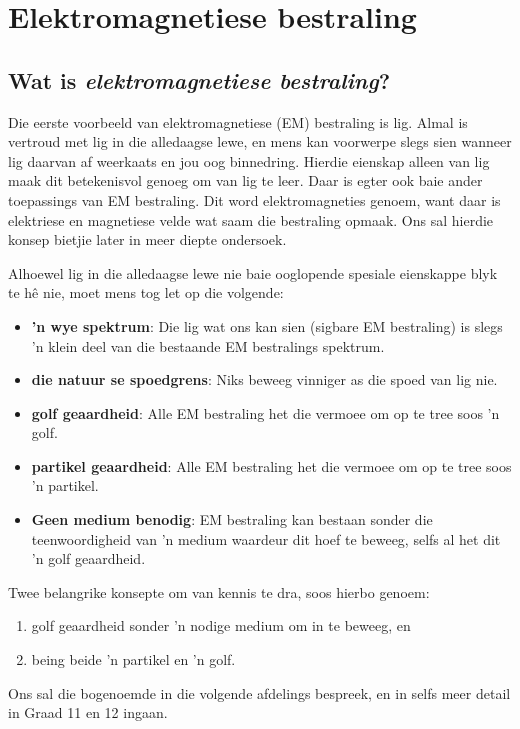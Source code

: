 \chapter{Elektromagnetiese bestraling}
    \setcounter{figure}{1}
    \setcounter{subfigure}{1}
    \label{459e2bef85baf867f5850bc8338cad3a}
         \section{Wat is \textsl{elektromagnetiese bestraling}?}
    \nopagebreak
  Die eerste voorbeeld van elektromagnetiese (EM) bestraling is lig. Almal is vertroud met lig in die alledaagse lewe, en mens kan voorwerpe slegs sien wanneer lig daarvan af weerkaats en jou oog binnedring. Hierdie eienskap alleen van lig maak dit betekenisvol genoeg om van lig te leer. Daar is egter ook baie ander toepassings van EM bestraling. Dit word elektromagneties genoem, want daar is elektriese en magnetiese velde wat saam die bestraling opmaak. Ons sal hierdie konsep bietjie later in meer diepte ondersoek. 


  Alhoewel lig in die alledaagse lewe nie baie ooglopende spesiale eienskappe blyk te h\^e nie, moet mens tog let op die volgende: 
\begin{itemize}
 \item \textbf{ 'n wye spektrum}: Die lig wat ons kan sien (sigbare EM bestraling) is slegs 'n klein deel van die bestaande EM bestralings spektrum. 
 \item \textbf{die natuur se spoedgrens}: Niks beweeg vinniger as die spoed van lig nie.  
 \item \textbf{golf geaardheid}: Alle EM bestraling het die vermoee om op te tree soos 'n golf. 
 \item \textbf{partikel geaardheid}: Alle EM bestraling het die vermoee om op te tree soos 'n partikel.
 \item \textbf{Geen medium benodig}: EM bestraling kan bestaan sonder die teenwoordigheid van 'n medium waardeur dit hoef te beweeg, selfs al het dit 'n golf geaardheid.
\end{itemize}

Twee belangrike konsepte om van kennis te dra, soos hierbo genoem:
\begin{enumerate}[noitemsep, label=\textbf{\arabic*}. ]
 \item golf geaardheid sonder 'n nodige medium om in te beweeg, en 
 \item being beide 'n partikel en 'n golf. 
\end{enumerate}
Ons sal die bogenoemde in die volgende afdelings bespreek, en in selfs meer detail in Graad 11 en 12 ingaan. 

